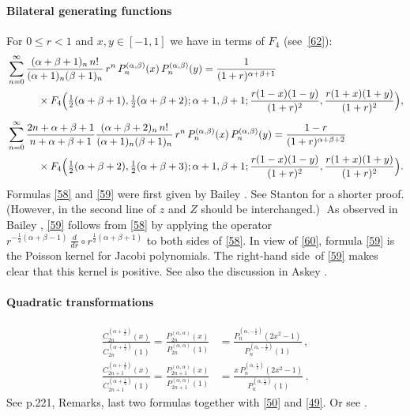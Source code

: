 \documentclass[twoside,11pt]{article}
\newcommand\sa{\smallskipamount}
\newcommand\sLP{\\[\sa]}
\newcommand\al\alpha
\newcommand\be\beta
\newcommand\half{\frac12}
\newcommand\thalf{\tfrac12}
\newcommand\iy\infty
\newcommand\RHS{right-hand side}
\begin{document}
\paragraph{Bilateral generating functions}
For $0\le r<1$ and $x,y\in[-1,1]$ we have in terms of $F_4$ (see~\eqref{62}):
\begin{align}
&\sum_{n=0}^\iy\frac{(\al+\be+1)_n\,n!}{(\al+1)_n(\be+1)_n}\,r^n\,
P_n^{(\al,\be)}(x)\,P_n^{(\al,\be)}(y)
=\frac1{(1+r)^{\al+\be+1}}
\nonumber\\
&\qquad\quad\times F_4\Big(\thalf(\al+\be+1),\thalf(\al+\be+2);\al+1,\be+1;
\frac{r(1-x)(1-y)}{(1+r)^2},\frac{r(1+x)(1+y)}{(1+r)^2}\Big),
\label{58}\sLP
&\sum_{n=0}^\iy\frac{2n+\al+\be+1}{n+\al+\be+1}
\frac{(\al+\be+2)_n\,n!}{(\al+1)_n(\be+1)_n}\,r^n\,
P_n^{(\al,\be)}(x)\,P_n^{(\al,\be)}(y)
=\frac{1-r}{(1+r)^{\al+\be+2}}\nonumber\\
&\qquad\quad\times F_4\Big(\thalf(\al+\be+2),\thalf(\al+\be+3);\al+1,\be+1;
\frac{r(1-x)(1-y)}{(1+r)^2},\frac{r(1+x)(1+y)}{(1+r)^2}\Big).
\label{59}
\end{align}
Formulas \eqref{58} and \eqref{59} were first
given by Bailey .
See Stanton  for a shorter proof.
(However, in the second line of
 $z$ and $Z$ should be interchanged.)$\;$
As observed in Bailey , \eqref{59} follows
from \eqref{58}
by applying the operator $r^{-\half(\al+\be-1)}\,\frac d{dr}\circ r^{\half(\al+\be+1)}$
to both sides of \eqref{58}.
In view of \eqref{60}, formula \eqref{59} is the Poisson kernel for Jacobi
polynomials. The \RHS\ of \eqref{59} makes clear that this kernel is positive.
See also the discussion in Askey .
%
\paragraph{Quadratic transformations}
\begin{align}
\frac{C_{2n}^{(\al+\half)}(x)}{C_{2n}^{(\al+\half)}(1)}
=\frac{P_{2n}^{(\al,\al)}(x)}{P_{2n}^{(\al,\al)}(1)}
&=\frac{P_n^{(\al,-\half)}(2x^2-1)}{P_n^{(\al,-\half)}(1)}\,,
\label{51}\\
\frac{C_{2n+1}^{(\al+\half)}(x)}{C_{2n+1}^{(\al+\half)}(1)}
=\frac{P_{2n+1}^{(\al,\al)}(x)}{P_{2n+1}^{(\al,\al)}(1)}
&=\frac{x\,P_n^{(\al,\half)}(2x^2-1)}{P_n^{(\al,\half)}(1)}\,.
\label{52}
\end{align}
See p.221, Remarks, last two formulas together with \eqref{50} and \eqref{49}.
Or see .
%
\end{document}
